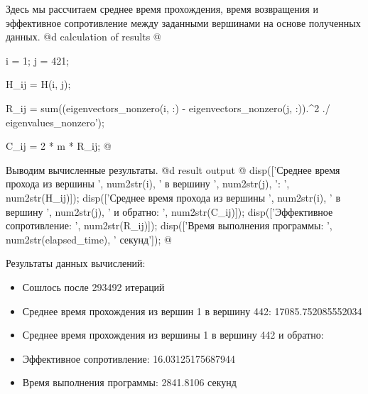 \documentclass[utf8x]{G7-32} %
\begin{document}
Здесь мы рассчитаем среднее время прохождения, время возвращения и эффективное сопротивление между заданными вершинами на основе полученных данных.
@d calculation of results @{
i = 1;
j = 421;

H_ij = H(i, j);

R_ij = sum((eigenvectors_nonzero(i, :) - eigenvectors_nonzero(j, :)).^2 ./ eigenvalues_nonzero');

C_ij = 2 * m * R_ij;
@}

Выводим вычисленные результаты.
@d result output @{
disp(['Среднее время прохода из вершины ', num2str(i), ' в вершину ', num2str(j), ': ', num2str(H_ij)]);
disp(['Среднее время прохода из вершины ', num2str(i), ' в вершину ', num2str(j), ' и обратно: ', num2str(C_ij)]);
disp(['Эффективное сопротивление: ', num2str(R_ij)]);
disp(['Время выполнения программы: ', num2str(elapsed_time), ' секунд']);
@}

 
 Результаты данных вычислений:
 \begin{itemize}
    \item Сошлось после 293492 итераций
    \item Среднее время прохождения из вершин 1 в вершину 442: 17085.752085552034
    \item Среднее время прохождения из вершины 1 в вершину 442 и обратно: 
    \item Эффективное сопротивление: 16.03125175687944
    \item Время выполнения программы: 2841.8106 секунд
\end{itemize}



\backmatter %




\end{document}
